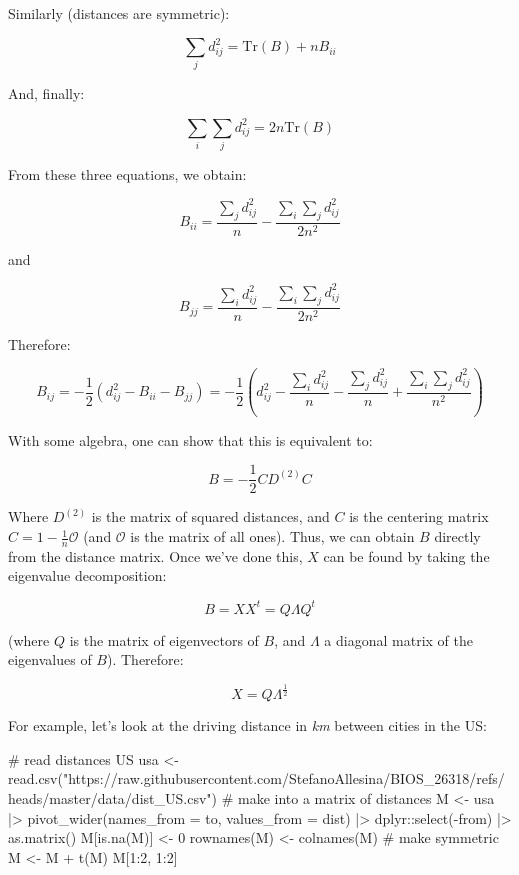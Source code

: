 \documentclass[
  letterpaper,
  DIV=11,
  numbers=noendperiod]{scrreprt}
\newenvironment{Shaded}{\begin{snugshade}}{\end{snugshade}}
\newcommand{\NormalTok}[1]{\textcolor[rgb]{0.00,0.23,0.31}{#1}}
\begin{document}
Similarly (distances are symmetric):

\[
\sum_j d_{ij}^2 = \text{Tr}(B) + n B_{ii} 
\]

And, finally:

\[
\sum_i \sum_j d_{ij}^2 = 2 n \text{Tr}(B)
\]

From these three equations, we obtain:

\[
B_{ii} = \frac{\sum_j d_{ij}^2}{n} - \frac{\sum_i \sum_j d_{ij}^2 }{2 n^2}
\]

and

\[
B_{jj} = \frac{\sum_i d_{ij}^2}{n} - \frac{\sum_i \sum_j d_{ij}^2 }{2 n^2}
\]

Therefore:

\[ 
B_{ij} = -\frac{1}{2}(d_{ij}^2 - B_{ii} - B_{jj}) = -\frac{1}{2}\left(d_{ij}^2 - \frac{\sum_i d_{ij}^2}{n} - \frac{\sum_j d_{ij}^2}{n}  + \frac{\sum_i \sum_j d_{ij}^2 }{n^2} \right)
\]

With some algebra, one can show that this is equivalent to:

\[B = -\frac{1}{2} C D^{(2)} C\]

Where \(D^{(2)}\) is the matrix of squared distances, and \(C\) is the
centering matrix \(C = 1 - \frac{1}{n}\mathcal O\) (and \(\mathcal O\)
is the matrix of all ones). Thus, we can obtain \(B\) directly from the
distance matrix. Once we've done this, \(X\) can be found by taking the
eigenvalue decomposition:

\[
B = X X^t = Q \Lambda Q^t
\]

(where \(Q\) is the matrix of eigenvectors of \(B\), and \(\Lambda\) a
diagonal matrix of the eigenvalues of \(B\)). Therefore:

\[ X = Q \Lambda^{\frac{1}{2}}\]

For example, let's look at the driving distance in \emph{km} between
cities in the US:

\begin{Shaded}
\begin{Highlighting}[]
\NormalTok{\# read distances US}
\NormalTok{usa \textless{}{-} read.csv("https://raw.githubusercontent.com/StefanoAllesina/BIOS\_26318/refs/heads/master/data/dist\_US.csv")}
\NormalTok{\# make into a matrix of distances}
\NormalTok{M \textless{}{-} usa |\textgreater{} pivot\_wider(names\_from = to, values\_from = \textasciigrave{}dist\textasciigrave{}) |\textgreater{} }
\NormalTok{  dplyr::select({-}from) |\textgreater{} }
\NormalTok{  as.matrix()}
\NormalTok{M[is.na(M)] \textless{}{-} 0 }
\NormalTok{rownames(M) \textless{}{-} colnames(M)}
\NormalTok{\# make symmetric}
\NormalTok{M \textless{}{-} M + t(M)}
\NormalTok{M[1:2, 1:2]}
\end{Highlighting}
\end{Shaded}
\end{document}
